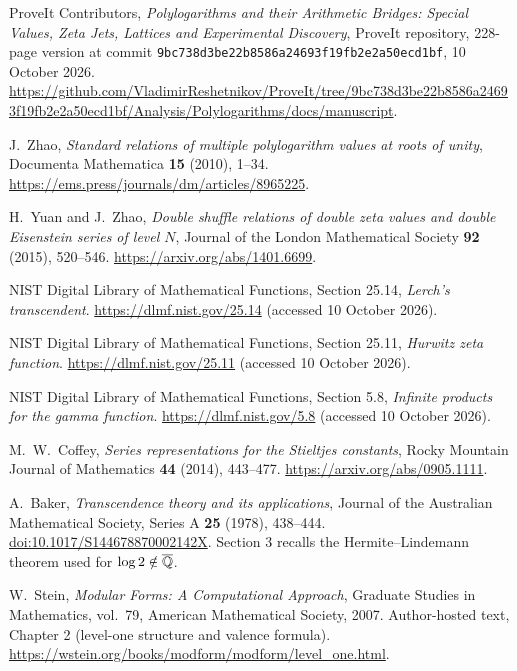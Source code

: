 ProveIt Contributors,
\emph{Polylogarithms and their Arithmetic Bridges:
Special Values, Zeta Jets, Lattices and Experimental Discovery},
ProveIt repository, 228-page version at commit
\texttt{9bc738d3be22b8586a24693f19fb2e2a50ecd1bf}, 10 October 2026.
\url{https://github.com/VladimirReshetnikov/ProveIt/tree/9bc738d3be22b8586a24693f19fb2e2a50ecd1bf/Analysis/Polylogarithms/docs/manuscript}.

J.~Zhao, \emph{Standard relations of multiple polylogarithm values at
roots of unity}, Documenta Mathematica \textbf{15} (2010), 1--34.
\url{https://ems.press/journals/dm/articles/8965225}.

H.~Yuan and J.~Zhao, \emph{Double shuffle relations of double zeta
values and double Eisenstein series of level $N$}, Journal of the London
Mathematical Society \textbf{92} (2015), 520--546.
\url{https://arxiv.org/abs/1401.6699}.

NIST Digital Library of Mathematical Functions, Section 25.14,
\emph{Lerch's transcendent}.
\url{https://dlmf.nist.gov/25.14} (accessed 10 October 2026).

NIST Digital Library of Mathematical Functions, Section 25.11,
\emph{Hurwitz zeta function}.
\url{https://dlmf.nist.gov/25.11} (accessed 10 October 2026).

NIST Digital Library of Mathematical Functions, Section 5.8,
\emph{Infinite products for the gamma function}.
\url{https://dlmf.nist.gov/5.8} (accessed 10 October 2026).

M.~W.~Coffey, \emph{Series representations for the Stieltjes constants},
Rocky Mountain Journal of Mathematics \textbf{44} (2014), 443--477.
\url{https://arxiv.org/abs/0905.1111}.

A.~Baker, \emph{Transcendence theory and its applications},
Journal of the Australian Mathematical Society, Series A
\textbf{25} (1978), 438--444.
\href{https://doi.org/10.1017/S144678870002142X}{doi:10.1017/S144678870002142X}.
Section 3 recalls the Hermite--Lindemann theorem used for
$\log2\notin\overline{\mathbb Q}$.



W.~Stein, \emph{Modular Forms: A Computational Approach},
Graduate Studies in Mathematics, vol.~79, American Mathematical Society, 2007.
Author-hosted text, Chapter 2 (level-one structure and valence formula).
\url{https://wstein.org/books/modform/modform/level_one.html}.


